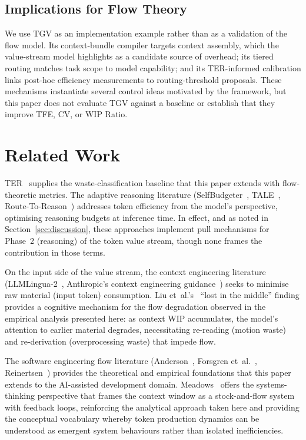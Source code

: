 \documentclass[journal]{IEEEtran}
\begin{document}
\subsection{Implications for Flow Theory}

We use TGV as an implementation example rather than as a validation of the flow model. Its context-bundle compiler targets context assembly, which the value-stream model highlights as a candidate source of overhead; its tiered routing matches task scope to model capability; and its TER-informed calibration links post-hoc efficiency measurements to routing-threshold proposals. These mechanisms instantiate several control ideas motivated by the framework, but this paper does not evaluate TGV against a baseline or establish that they improve TFE, CV, or WIP Ratio.

\section{Related Work}
\label{sec:related}

TER~\cite{griffin2026ter} supplies the waste-classification baseline that this paper extends with flow-theoretic metrics. The adaptive reasoning literature (SelfBudgeter~\cite{selfbudgeter2025}, TALE~\cite{tale2024}, Route-To-Reason~\cite{routetoreason2025}) addresses token efficiency from the model's perspective, optimising reasoning budgets at inference time. In effect, and as noted in Section~\ref{sec:discussion}, these approaches implement pull mechanisms for Phase~2 (reasoning) of the token value stream, though none frames the contribution in those terms.

On the input side of the value stream, the context engineering literature (LLMLingua-2~\cite{llmlingua2_2024}, Anthropic's context engineering guidance~\cite{anthropic_context2025}) seeks to minimise raw material (input token) consumption. Liu et~al.'s~\cite{liu2024} ``lost in the middle'' finding provides a cognitive mechanism for the flow degradation observed in the empirical analysis presented here: as context WIP accumulates, the model's attention to earlier material degrades, necessitating re-reading (motion waste) and re-derivation (overprocessing waste) that impede flow.

The software engineering flow literature (Anderson~\cite{anderson2010}, Forsgren et~al.~\cite{forsgren2018, forsgren2021}, Reinertsen~\cite{reinertsen2009}) provides the theoretical and empirical foundations that this paper extends to the AI-assisted development domain. Meadows~\cite{meadows2008} offers the systems-thinking perspective that frames the context window as a stock-and-flow system with feedback loops, reinforcing the analytical approach taken here and providing the conceptual vocabulary whereby token production dynamics can be understood as emergent system behaviours rather than isolated inefficiencies.
\end{document}
